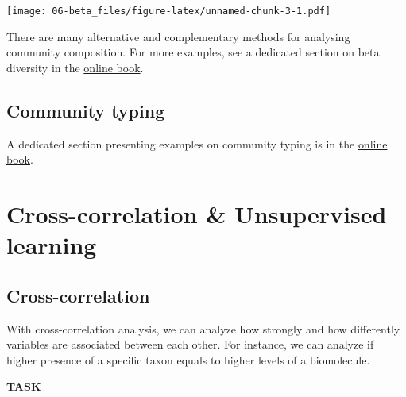 \documentclass[
  oneside]{book}
\begin{document}
\texttt{[image: 06-beta\_files/figure-latex/unnamed-chunk-3-1.pdf]}

There are many alternative and complementary methods for analysing
community composition. For more examples, see a dedicated section on
beta diversity in the \href{https://microbiome.github.io/OMA/microbiome-diversity.html\#beta-diversity}{online
book}.

\hypertarget{community-typing}{%
\section{Community typing}\label{community-typing}}

A dedicated section presenting examples on community typing is in the
\href{https://microbiome.github.io/OMA/microbiome-community.html\#community-typing}{online book}.

\hypertarget{cross-correlation-unsupervised-learning}{%
\chapter{Cross-correlation \& Unsupervised learning}\label{cross-correlation-unsupervised-learning}}

\hypertarget{cross-correlation}{%
\section{Cross-correlation}\label{cross-correlation}}

With cross-correlation analysis, we can analyze how strongly and how differently variables
are associated between each other. For instance, we can analyze if higher presence of a
specific taxon equals to higher levels of a biomolecule.

\textbf{TASK}
\end{document}
